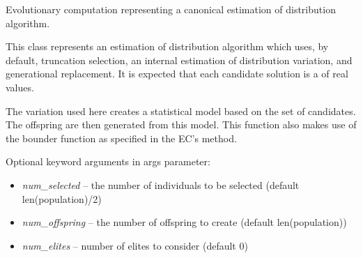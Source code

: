 \documentclass[letterpaper,10pt,english]{sphinxmanual}
\begin{document}

\begin{fulllineitems}
\label{reference:inspyred.ec.EDA}
Evolutionary computation representing a canonical estimation of distribution algorithm.

This class represents an estimation of distribution algorithm which
uses, by default, truncation selection, an internal estimation of 
distribution variation, and generational replacement. It is expected 
that each candidate solution is a  of real values.

The variation used here creates a statistical model based on the set 
of candidates. The offspring are then generated from this model. This 
function also makes use of the bounder function as specified in the EC's 
 method.

Optional keyword arguments in  args parameter:
\begin{itemize}
\item {} 
\emph{num\_selected} -- the number of individuals to be selected 
(default len(population)/2)

\item {} 
\emph{num\_offspring} -- the number of offspring to create (default len(population))

\item {} 
\emph{num\_elites} -- number of elites to consider (default 0)

\end{itemize}

\end{fulllineitems}

\end{document}
